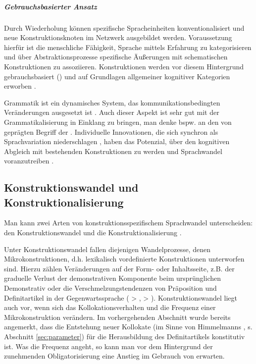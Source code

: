 \subparagraph*{Gebrauchsbasierter Ansatz}
Durch Wiederholung können spezifische Spracheinheiten konventionalisiert und neue Konstruktionsknoten im Netzwerk ausgebildet werden. Voraussetzung hierfür ist die menschliche Fähigkeit, Sprache mittels Erfahrung zu kategorisieren und über Abstraktionsprozesse spezifische Äußerungen mit schematischen Konstruktionen zu assoziieren. Konstruktionen werden vor diesem Hintergrund gebrauchsbasiert () und auf Grundlagen allgemeiner kognitiver Kategorien erworben \parencite[u.a.][]{Langacker1987,Goldberg2006,Bybee2006,Bybee2010,Bybee2013}.

Grammatik ist ein dynamisches System, das kommunikationsbedingten Veränderungen ausgesetzt ist \parencite[35f.]{Imo2007}. Auch dieser Aspekt ist sehr gut mit der Grammatikalisierung in Einklang zu bringen, man denke bspw. an den von  \textcite{Hopper1991} geprägten Begriff der . Individuelle Innovationen, die sich synchron als Sprachvariation niederschlagen \parencite{Croft2010}, haben das Potenzial, über den kognitiven Abgleich mit bestehenden Konstruktionen  zu werden und Sprachwandel voranzutreiben \parencite{Langacker1987}. 

\subsection{Konstruktionswandel und Konstruktionalisierung}\label{sec:konstruktionalisierung}

Man kann zwei Arten von konstruktionsspezifischem Sprachwandel unterscheiden: den Konstruktionswandel und die Konstruktionalisierung \parencite[vgl.][]{Hilpert2011,Hilpert2013,Fried2013,Traugott2013,Traugott2015,Trousdale2014}. 

Unter Konstruktionswandel fallen diejenigen Wandelprozesse, denen Mikrokonstruktionen, d.h. lexikalisch vordefinierte Konstruktionen unterworfen sind. Hierzu zählen Veränderungen auf der Form- oder Inhaltsseite, z.B. der graduelle Verlust der demonstrativen Komponente beim ursprünglichen Demonstrativ  oder die Verschmelzungstendenzen von Präposition und Definitartikel in der Gegenwartssprache ( > ,  > ). Konstruktionswandel liegt auch vor, wenn sich das Kollokationsverhalten und die Frequenz einer Mikrokonstruktion verändern. Im vorhergehenden Abschnitt wurde bereits angemerkt, dass die Entstehung neuer Kollokate (im Sinne von Himmelmanns  , s. Abschnitt \ref{sec:parameter}) für die Herausbildung des Definitartikels konstitutiv ist. Was die Frequenz angeht, so kann man vor dem Hintergrund der zunehmenden Obligatorisierung eine Anstieg im Gebrauch von  erwarten. 

